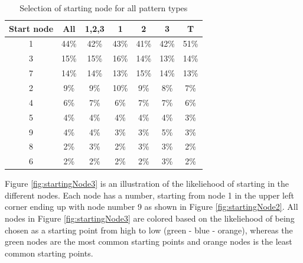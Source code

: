     \begin{table}[H]
      \centering
      \begin{tabular}{ c || c | c || c | c | c | c }
        \hline
        {\bf Start node} & All & 1,2,3 & 1 & 2 & 3 & T \\ \hline
        1 & 44\% & 42\% & 43\% & 41\% & 42\% & 51\% \\
        3 & 15\% & 15\% & 16\% & 14\% & 13\% & 14\% \\
        7 & 14\% & 14\% & 13\% & 15\% & 14\% & 13\% \\
        2 & 9\%  & 9\%  & 10\% & 9\%  & 8\%  & 7\%  \\
        4 & 6\%  & 7\%  & 6\%  & 7\%  & 7\%  & 6\%  \\
        5 & 4\%  & 4\%  & 4\%  & 4\%  & 4\%  & 3\%  \\
        9 & 4\%  & 4\%  & 3\%  & 3\%  & 5\%  & 3\%  \\
        8 & 2\%  & 3\%  & 2\%  & 3\%  & 3\%  & 2\%  \\
        6 & 2\%  & 2\%  & 2\%  & 2\%  & 3\%  & 2\%  \\ \hline
      \end{tabular}
      \caption{Selection of starting node for all pattern types}
      \label{tab:startingNode1}
    \end{table}

    Figure \ref{fig:startingNode3} is an illustration of the likeliehood of starting in the different nodes. Each node has a number, starting from node 1 in the upper left corner ending up with node number 9 as shown in Figure \ref{fig:startingNode2}. All nodes in Figure \ref{fig:startingNode3} are colored based on the likeliehood of being chosen as a starting point from high to low (green - blue - orange), whereas the green nodes are the most common starting points and orange nodes is the least common starting points.

